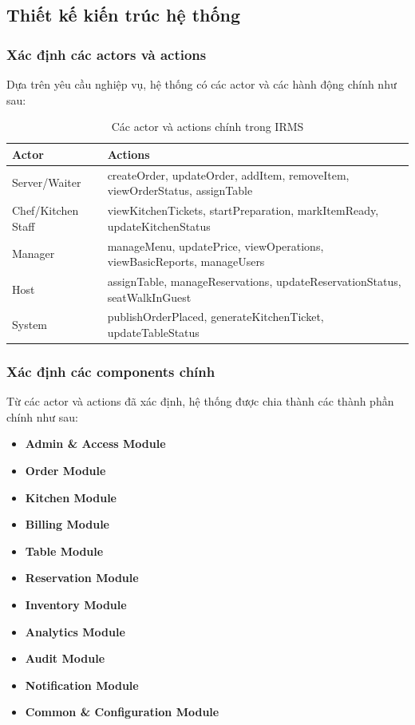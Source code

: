 \documentclass[12pt,a4paper]{article}
\begin{document}
\subsection{Thiết kế kiến trúc hệ thống}

\subsubsection{Xác định các actors và actions}

Dựa trên yêu cầu nghiệp vụ, hệ thống có các actor và các hành động chính như sau:

\begin{table}[H]
\centering
\caption{Các actor và actions chính trong IRMS}
\begin{tabular}{|p{3cm}|p{10cm}|}
\hline
\textbf{Actor} & \textbf{Actions} \\
\hline
Server/Waiter & createOrder, updateOrder, addItem, removeItem, viewOrderStatus, assignTable \\
\hline
Chef/Kitchen Staff & viewKitchenTickets, startPreparation, markItemReady, updateKitchenStatus \\
\hline
Manager & manageMenu, updatePrice, viewOperations, viewBasicReports, manageUsers \\
\hline
Host & assignTable, manageReservations, updateReservationStatus, seatWalkInGuest \\
\hline
System & publishOrderPlaced, generateKitchenTicket, updateTableStatus \\
\hline
\end{tabular}
\end{table}

\subsubsection{Xác định các components chính}

Từ các actor và actions đã xác định, hệ thống được chia thành các thành phần chính như sau:
\begin{itemize}
    \item \textbf{Admin \& Access Module}
    \item \textbf{Order Module}
    \item \textbf{Kitchen Module}
    \item \textbf{Billing Module}
    \item \textbf{Table Module}
    \item \textbf{Reservation Module}
    \item \textbf{Inventory Module}
    \item \textbf{Analytics Module}
    \item \textbf{Audit Module}
    \item \textbf{Notification Module}
    \item \textbf{Common \& Configuration Module}
\end{itemize}
\end{document}

